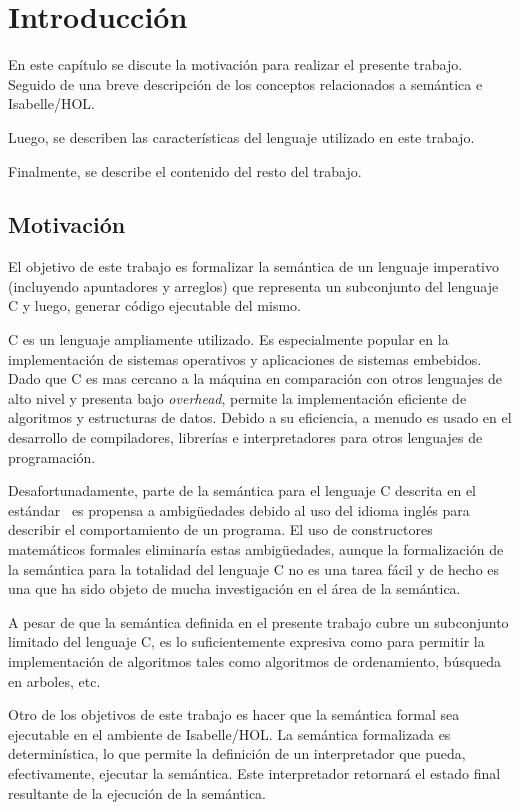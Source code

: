 \chapter{Introducción}\label{chapter:introduction}

En este capítulo se discute la motivación para realizar el presente trabajo.
Seguido de una breve descripción de los conceptos relacionados a semántica e Isabelle/HOL.

Luego, se describen las características del lenguaje utilizado en este trabajo.

Finalmente, se describe el contenido del resto del trabajo.

\section{Motivación}

El objetivo de este trabajo es formalizar la semántica de un lenguaje imperativo (incluyendo apuntadores y arreglos) que representa un subconjunto del lenguaje C y luego, generar código ejecutable del mismo.

C es un lenguaje ampliamente utilizado.
Es especialmente popular en la implementación de sistemas operativos y aplicaciones de sistemas embebidos.
Dado que C es mas cercano a la máquina en comparación con otros lenguajes de alto nivel y presenta bajo \textit{overhead}, permite la implementación eficiente de algoritmos y estructuras de datos.
Debido a su eficiencia, a menudo es usado en el desarrollo de compiladores, librerías e interpretadores para otros lenguajes de programación.

Desafortunadamente, parte de la semántica para el lenguaje C descrita en el estándar~\citep{c99} es propensa a ambigüedades debido al uso del idioma inglés para describir el comportamiento de un programa.
El uso de constructores matemáticos formales eliminaría estas ambigüedades, aunque la formalización de la semántica para la totalidad del lenguaje C no es una tarea fácil y de hecho es una que ha sido objeto de mucha investigación en el área de la semántica.

A pesar de que la semántica definida en el presente trabajo cubre un subconjunto limitado del lenguaje C, es lo suficientemente expresiva como para permitir la implementación de algoritmos tales como algoritmos de ordenamiento, búsqueda en arboles, etc.

Otro de los objetivos de este trabajo es hacer que la semántica formal sea ejecutable en el ambiente de Isabelle/HOL.
La semántica formalizada es determinística, lo que permite la definición de un interpretador que pueda, efectivamente, ejecutar la semántica.
Este interpretador retornará el estado final resultante de la ejecución de la semántica.

